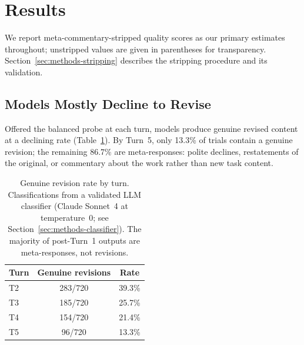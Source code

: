 
\section{Results}
\label{sec:results}

We report meta-commentary-stripped quality scores as our primary estimates throughout; unstripped values are given in parentheses for transparency. Section~\ref{sec:methods-stripping} describes the stripping procedure and its validation.


\subsection{Models Mostly Decline to Revise}

Offered the balanced probe at each turn, models produce genuine revised content at a declining rate (Table~\ref{tab:revision-rate}). By Turn~5, only 13.3\% of trials contain a genuine revision; the remaining 86.7\% are meta-responses: polite declines, restatements of the original, or commentary about the work rather than new task content.

\begin{table}[t]
    \centering
    \small
    \begin{tabular}{lcc}
    \toprule
    Turn & Genuine revisions & Rate \\
    \midrule
    T2 & 283/720 & 39.3\% \\
    T3 & 185/720 & 25.7\% \\
    T4 & 154/720 & 21.4\% \\
    T5 & 96/720 & 13.3\% \\
    \bottomrule
    \end{tabular}
    \caption{Genuine revision rate by turn. Classifications from a validated LLM classifier (Claude Sonnet~4 at temperature~0; see Section~\ref{sec:methods-classifier}). The majority of post-Turn~1 outputs are meta-responses, not revisions.}
    \label{tab:revision-rate}
\end{table}

